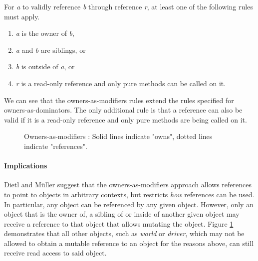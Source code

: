 \documentclass[sigplan,11pt,nonacm]{acmart}
\begin{document}
For \emph{a} to validly reference \emph{b} through reference \emph{r}, at least one of the following rules \cite{ownership-types-survey} must apply.
\begin{enumerate}
  \item \emph{a} is the owner of \emph{b},
  \item \emph{a} and \emph{b} are siblings, or
  \item \emph{b} is outside of \emph{a}, or
  \item \emph{r} is a read-only reference and only pure methods can be called on it.
\end{enumerate}
We can see that the owners-as-modifiers rules extend the rules specified for owners-as-dominators.
The only additional rule is that a reference can also be valid if it is a read-only reference and only pure methods are being called on it.

\begin{figure}

  \caption{Owners-as-modifiers \cite{ownership-types-survey}: Solid lines indicate "owns", dotted lines indicate "references".}
  \label{fig:owners-as-modifiers}
\end{figure}

\paragraph{Implications}

Dietl and Müller \cite{lightweight-ownership} suggest that the owners-as-modifiers approach allows references to point to objects in arbitrary contexts, but restricts \emph{how} references can be used.
In particular, any object can be referenced by any given object.
However, only an object that is the owner of, a sibling of or inside of another given object may receive a reference to that object that allows mutating the object.
Figure \ref{fig:owners-as-modifiers} demonstrates that all other objects, such as \emph{world} or \emph{driver}, which may not be allowed to obtain a mutable reference to an object for the reasons above, can still receive read access to said object.
\end{document}
